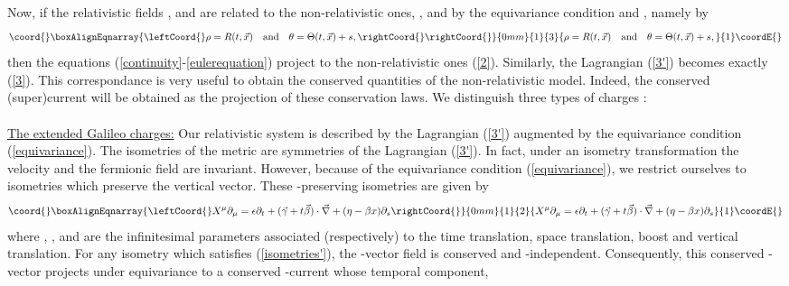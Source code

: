 \documentclass[11pt,a4paper]{article}
\begin{document}
Now, if the relativistic fields \myHighlight{$\rho$}\coordHE{}, \myHighlight{$\theta$}\coordHE{} and \myHighlight{$\tilde{\psi}$}\coordHE{} are related to the non-relativistic ones, \coordHE{}, \myHighlight{$\Theta$}\coordHE{} and \myHighlight{$\psi$}\coordHE{} by the equivariance condition\cite{HH} and \cite{DBKP}, namely by
\begin{eqnarray}\coord{}\boxAlignEqnarray{\leftCoord{}
\rho=R(t, \vec{x})\quad\mbox{and}\quad \theta=\Theta(t, \vec{x})+s, \rightCoord{}
\label{equivariance}
\rightCoord{}}{0mm}{1}{3}{
\rho=R(t, \vec{x})\quad\mbox{and}\quad \theta=\Theta(t, \vec{x})+s, 
}{1}\coordE{}\end{eqnarray}
then the equations (\ref{continuity}-\ref{eulerequation}) project to the non-relativistic ones (\ref{2}). Similarly, the Lagrangian (\ref{3'}) becomes exactly (\ref{3}). This correspondance is very useful to obtain the conserved quantities of the non-relativistic model. Indeed, the conserved (super)current will be obtained as the projection of these conservation laws. We distinguish three types of charges :\\
\\
\myHighlight{$\bullet$}\coordHE{} \underline{The extended Galileo charges:} Our relativistic system is described by the Lagrangian (\ref{3'}) augmented by the equivariance condition (\ref{equivariance}). The isometries of the metric \coordHE{} are symmetries of the Lagrangian (\ref{3'}). In fact, under an isometry transformation the velocity \coordHE{} and the fermionic field \myHighlight{$\psi$}\coordHE{} are invariant. However, because of the equivariance condition (\ref{equivariance}), we restrict ourselves to isometries which preserve the vertical vector. These \myHighlight{$\xi$}\coordHE{}-preserving isometries are given by
\begin{eqnarray}\coord{}\boxAlignEqnarray{\leftCoord{}
X^\mu\partial_\mu=\epsilon\partial_t+(\vec{\gamma}+t\vec{\beta})\cdot\vec{\nabla}+(\eta-\beta 
x)\partial_s
\label{isometries'}
\rightCoord{}}{0mm}{1}{2}{
X^\mu\partial_\mu=\epsilon\partial_t+(\vec{\gamma}+t\vec{\beta})\cdot\vec{\nabla}+(\eta-\beta 
x)\partial_s
}{1}\coordE{}\end{eqnarray} 
where \myHighlight{$\epsilon$}\coordHE{}, \myHighlight{$\vec{\gamma}$}\coordHE{}, \myHighlight{$\vec{\beta}$}\coordHE{} and \myHighlight{$\eta$}\coordHE{} are the infinitesimal parameters associated (respectively) to the time translation, space translation, boost and vertical translation. For any isometry which satisfies (\ref{isometries'}), the \coordHE{}-vector field \coordHE{} is conserved and \coordHE{}-independent. Consequently, this conserved \coordHE{}-vector projects under equivariance to a conserved \coordHE{}-current whose temporal component,
\end{document}

